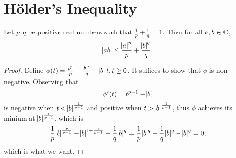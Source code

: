 \section{Hölder's Inequality}
\begin{lemma}
Let $p, q$ be positive real numbers such that $\frac{1}{p} + \frac{1}{q}
= 1$. 
Then for all $a, b \in \mathbb{C}$, 
\begin{equation}
    \abs{ab} \le \frac{\abs{a}^p}{p} + \frac{\abs{b}^q}{q}. 
\end{equation}
\end{lemma}
\begin{proof}
Define $\phi(t) = \frac{t^p}{p} + \frac{\abs{b}^q}{q} - \abs{b} t, t \ge 0$. 
It suffices to show that $\phi$ is non negative. 
Observing that 
\begin{equation*}
    \phi'(t) = t^{p-1} - \abs{b}
\end{equation*}
is negative when $t < \abs{b}^\frac{1}{p-1}$ and positive when 
$t > \abs{b}^\frac{1}{p-1}$, thus $\phi$ achieves its minium at 
$\abs{b}^\frac{1}{p-1}$, which is 
\begin{equation*}
    \frac{1}{p} \abs{b}^\frac{p}{p - 1} 
        - \abs{b}^{1+ \frac{1}{p - 1}} 
        + \frac{1}{q} \abs{b}^q 
    = \frac{1}{p} \abs{b} ^q + \frac{1}{q} \abs{b}^q - \abs{b}^q 
    = 0, 
\end{equation*}
which is what we want.
\end{proof}

